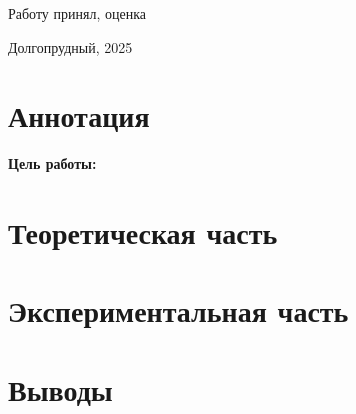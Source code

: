 \documentclass[a4paper, 12pt]{article}
\begin{document}
\begin{titlepage}
    \vspace{1em}

    \begin{flushleft}
        Работу принял, оценка
        \hspace{15em}
    \end{flushleft}

    \vspace{5em}
    
    \begin{center}
        Долгопрудный, 2025
    \end{center}
\end{titlepage}

\newpage
\tableofcontents

\newpage
\section{Аннотация}
\textbf{Цель работы:} 

    
   

\section{Теоретическая часть}



\section{Экспериментальная часть}


\section{Выводы}
\end{document}
